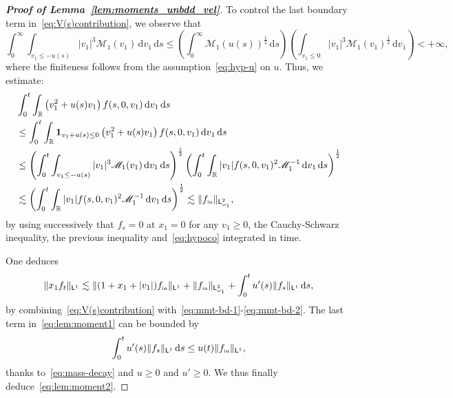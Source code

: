 \documentclass[11pt]{amsart}
\theoremstyle{definition}
\theoremstyle{remark}
\numberwithin{equation}{section}
\newcommand\R{{\mathbb R}}
\def\MMM{{\mathscr M}}
\newcommand{\dd}{{\, \mathrm d}}
\newcommand{\init}{\text{{\tiny {\rm in}}}}
\newcommand{\sfL}{\mathsf{L}}
\begin{document}
\begin{proof}[{\bf Proof of Lemma~\ref{lem:moments_unbdd_vel}}]
  To control the last boundary term in~\eqref{eq:V(s)contribution}, we observe that
  \begin{equation*}
    \int_0^\infty \int_{v_1 \leq -u(s)} |v_1|^3 \MMM_1(v_1)\, \mathrm{d}v_1\, \mathrm{d}s 
    \leq \left( \int_0^\infty \MMM_1(u(s))^{\frac{1}{2}} \, \mathrm{d}s \right) \left( \int_{v_1 \leq 0} |v_1|^3 \MMM_1(v_1)^{\frac{1}{2}} \, \mathrm{d}v_1 \right) < +\infty,
  \end{equation*}
  where the finiteness follows from the assumption~\eqref{eq:hyp-u} on $u$. Thus, we estimate:
  \begin{align}
    \nonumber
    & \int_0^t \int_{\R} \left( v_1^2 + u(s) v_1 \right) f(s,0,v_1) \dd v_1 \dd s \\
    \nonumber
    & \le \int_0^t \int_{\R} {\bf 1}_{v_1+u(s) \le 0} \left( v_1^2 + u(s) v_1 \right) f(s,0,v_1) \dd v_1 \dd s \\ 
    \nonumber
    & \le \left( \int_0^t  \int_{v_1 \le - u(s)} | v_1 |^3 \MMM_1(v_1)\dd v_1 \dd s \right)^{\frac12} \left( \int_0^t \int_{\R} |v_1| f(s,0,v_1)^2 \MMM_1^{-1} \dd v_1 \dd s  \right)^{\frac12} \\
    \label{eq:mmt-bd-2}
    & \lesssim \left( \int_0^t \int_{\R} |v_1| f(s,0,v_1)^2 \MMM_1^{-1} \dd v_1 \dd s \right)^{\frac12} \lesssim \|f_\init\|_{\sfL^{2}_{\omega_1}},
  \end{align}
  by using successively that $f_s =0$ at $x_1=0$ for any $v_1 \ge 0$, the Cauchy-Schwarz inequality, the previous inequality and~\eqref{eq:hypoco} integrated in time. 

  One deduces
  \begin{equation}
    \label{eq:lem:moment1}
    \| x_1 f_t \|_{\sfL^{1}} \lesssim
    \| (1+ x_1 + |v_1|) f_\init \|_{\sfL^{1}} +  \| f_\init \|_{\sfL^{2}_{\omega_1}} + 
    \int_0^t   u'(s) \| f_s \|_{\sfL^{1}} \dd s,
  \end{equation}
  by combining~\eqref{eq:V(s)contribution} with~\eqref{eq:mmt-bd-1}-\eqref{eq:mmt-bd-2}. The last term in~\eqref{eq:lem:moment1} can be bounded by
  \begin{equation*}
    \int_0^t   u'(s) \| f_s \|_{\sfL^1} \dd s \le u(t) \| f_\init \|_{\sfL^1},
  \end{equation*}
  thanks to~\eqref{eq:mass-decay} and \( u \ge 0 \) and \( u' \ge 0 \). We thus finally deduce~\eqref{eq:lem:moment2}.
\end{proof}
\end{document}
